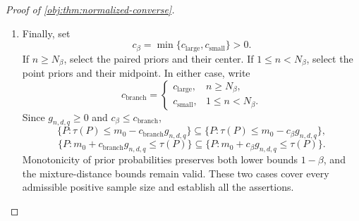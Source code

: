 \begin{proof}[Proof of \cref{obj:thm:normalized-converse}]
\begin{enumerate}
\item
Finally, set
\[
c_\beta=\min\{c_{\mathrm{large}},c_{\mathrm{small}}\}>0.
\]
If \(n\ge N_\beta\), select the paired priors and their center. If
\(1\le n<N_\beta\), select the point priors and their midpoint.
In either case, write
\[
c_{\mathrm{branch}}
=
\begin{cases}
c_{\mathrm{large}},&n\ge N_\beta,\\
c_{\mathrm{small}},&1\le n<N_\beta.
\end{cases}
\]
Since \(g_{n,d,q}\ge0\) and \(c_\beta\le c_{\mathrm{branch}}\),
\[
\{P:\tau(P)\le m_0-c_{\mathrm{branch}}g_{n,d,q}\}
\subseteq
\{P:\tau(P)\le m_0-c_\beta g_{n,d,q}\},
\]
\[
\{P:m_0+c_{\mathrm{branch}}g_{n,d,q}\le\tau(P)\}
\subseteq
\{P:m_0+c_\beta g_{n,d,q}\le\tau(P)\}.
\]
Monotonicity of prior probabilities preserves both lower bounds
\(1-\beta\), and the mixture-distance bounds remain valid. These two cases cover every admissible positive sample size and establish all the assertions.
\end{enumerate}
\end{proof}
